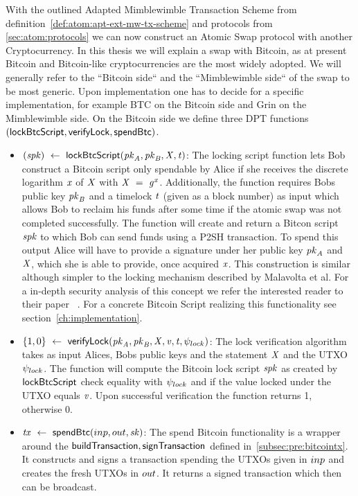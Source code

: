 With the outlined Adapted Mimblewimble Transaction Scheme from definition~\ref{def:atom:apt-ext-mw-tx-scheme} and protocols from \ref{sec:atom:protocols} we can now construct an Atomic Swap protocol with another Cryptocurrency.
In this thesis we will explain a swap with Bitcoin, as at present Bitcoin and Bitcoin-like cryptocurrencies are the most widely adopted.
We will generally refer to the ``Bitcoin side`` and the ``Mimblewimble side`` of the swap to be most generic.
Upon implementation one has to decide for a specific implementation, for example BTC on the Bitcoin side and Grin on
the Mimblewimble side.
On the Bitcoin side we define three DPT functions $(\mathsf{lockBtcScript}, \mathsf{verifyLock}, \mathsf{spendBtc})$.
\begin{itemize}
    \item $(\mathit{spk}) ~\leftarrow~ \mathsf{lockBtcScript} (\mathit{pk}_{\mathit{A}},\mathit{pk}_{\mathit{B}},\mathit{X},\mathit{t})$:
    The locking script function lets Bob construct a Bitcoin script only spendable by Alice if she receives the discrete logarithm $\mathit{x}$ of $\mathit{X}$ with $\mathit{X} ~=~ \mathit{g}^{\mathit{x}}$.
    Additionally, the function requires Bobs public key $\mathit{pk}_{\mathit{B}}$ and a timelock $\mathit{t}$ (given as a block number) as input which allows Bob to reclaim his funds after some time if the atomic swap was not completed successfully.
    The function will create and return a Bitcon script $\mathit{spk}$ to which Bob can send funds using a P2SH transaction.
    To spend this output Alice will have to provide a signature under her public key $\mathit{pk}_{\mathit{A}}$ and $\mathit{X}$, which she is able to provide, once acquired $\mathit{x}$.
    This construction is similar although simpler to the locking mechanism described by Malavolta et al.
    For a in-depth security analysis of this concept we refer the interested reader to their paper ~\cite{malavolta2019anonymous}.
    For a concrete Bitcoin Script realizing this functionality see section~\ref{ch:implementation}.
    \item $\{ 1,0 \} ~\leftarrow~ \mathsf{verifyLock} (\mathit{pk}_{\mathit{A}},\mathit{pk}_{\mathit{B}},\mathit{X},\mathit{v},\mathit{t},\psi_{lock})$:
    The lock verification algorithm takes as input Alices, Bobs public keys and the statement $\mathit{X}$ and the UTXO $\psi_{lock}$.
    The function will compute the Bitcoin lock script $\mathit{spk}$ as created by $\mathsf{lockBtcScript}$ check equality with $\psi_{lock}$ and if the value locked under the UTXO equals $\mathit{v}$.
    Upon successful verification the function returns 1, otherwise 0.
    \item $\mathit{tx} ~\leftarrow~ \mathsf{spendBtc}(inp,out,\mathit{sk})$:
    The spend Bitcoin functionality is a wrapper around the $\mathsf{buildTransaction}, \mathsf{signTransaction}$ defined in~\ref{subsec:pre:bitcointx}.
    It constructs and signs a transaction spending the UTXOs given in $inp$ and creates the fresh UTXOs in $out$.
    It returns a signed transaction which then can be broadcast.
\end{itemize}

